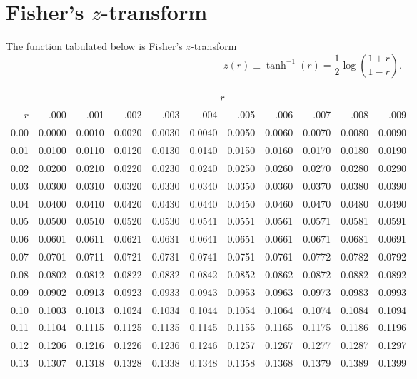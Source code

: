 \section{Fisher's $z$-transform}
\label{Fisher}
\noindent
The function tabulated below is Fisher's $z$-transform
\[
z(r)\equiv \tanh^{-1}(r) = \frac12\log\left(\frac{1+r}{1-r}\right).
\]


\begin{center}
	\small
	\setlength{\tabcolsep}{10pt}
	\begin{tabular}{r*{10}{r}}
		& \multicolumn{10}{c}{$r$} \\
		\cline{2-11}
		$r$ & .000 & .001 & .002 & .003 & .004 & .005 & .006 & .007 & .008 & .009 \\
		\midrule
		0.00 & 0.0000 & 0.0010 & 0.0020 & 0.0030 & 0.0040 & 0.0050 & 0.0060 & 0.0070 & 0.0080 & 0.0090 \\
		0.01 & 0.0100 & 0.0110 & 0.0120 & 0.0130 & 0.0140 & 0.0150 & 0.0160 & 0.0170 & 0.0180 & 0.0190 \\
		0.02 & 0.0200 & 0.0210 & 0.0220 & 0.0230 & 0.0240 & 0.0250 & 0.0260 & 0.0270 & 0.0280 & 0.0290 \\
		0.03 & 0.0300 & 0.0310 & 0.0320 & 0.0330 & 0.0340 & 0.0350 & 0.0360 & 0.0370 & 0.0380 & 0.0390 \\
		0.04 & 0.0400 & 0.0410 & 0.0420 & 0.0430 & 0.0440 & 0.0450 & 0.0460 & 0.0470 & 0.0480 & 0.0490 \\
		0.05 & 0.0500 & 0.0510 & 0.0520 & 0.0530 & 0.0541 & 0.0551 & 0.0561 & 0.0571 & 0.0581 & 0.0591 \\
		0.06 & 0.0601 & 0.0611 & 0.0621 & 0.0631 & 0.0641 & 0.0651 & 0.0661 & 0.0671 & 0.0681 & 0.0691 \\
		0.07 & 0.0701 & 0.0711 & 0.0721 & 0.0731 & 0.0741 & 0.0751 & 0.0761 & 0.0772 & 0.0782 & 0.0792 \\
		0.08 & 0.0802 & 0.0812 & 0.0822 & 0.0832 & 0.0842 & 0.0852 & 0.0862 & 0.0872 & 0.0882 & 0.0892 \\
		0.09 & 0.0902 & 0.0913 & 0.0923 & 0.0933 & 0.0943 & 0.0953 & 0.0963 & 0.0973 & 0.0983 & 0.0993 \\[5pt]
		0.10 & 0.1003 & 0.1013 & 0.1024 & 0.1034 & 0.1044 & 0.1054 & 0.1064 & 0.1074 & 0.1084 & 0.1094 \\
		0.11 & 0.1104 & 0.1115 & 0.1125 & 0.1135 & 0.1145 & 0.1155 & 0.1165 & 0.1175 & 0.1186 & 0.1196 \\
		0.12 & 0.1206 & 0.1216 & 0.1226 & 0.1236 & 0.1246 & 0.1257 & 0.1267 & 0.1277 & 0.1287 & 0.1297 \\
		0.13 & 0.1307 & 0.1318 & 0.1328 & 0.1338 & 0.1348 & 0.1358 & 0.1368 & 0.1379 & 0.1389 & 0.1399 \\

\end{tabular}
\end{center}
